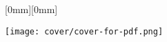 \thispagestyle{empty}
\raisebox{0mm}[0mm][0mm]{%
\parbox{8.5in}{
\vspace*{236mm}\hspace{-38.5mm}\texttt{[image: cover/cover-for-pdf.png]}\\
}
}%
\\
